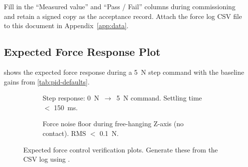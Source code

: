 \begin{notebox}
  Fill in the ``Measured value'' and ``Pass / Fail'' columns during
  commissioning and retain a signed copy as the acceptance record.
  Attach the force log CSV file to this document in Appendix~\ref{app:data}.
\end{notebox}


\subsection{Expected Force Response Plot}
\label{sec:verif:plot}

 shows the expected force response during a
\SI{5}{\newton} step command with the baseline gains from
\cref{tab:pid-defaults}.

\begin{figure}[H]
  \centering
  \begin{subfigure}[b]{0.48\textwidth}
    \fbox{\parbox{\textwidth}{\centering\vspace{28mm}
      \textcolor{PBAGray}{[PLOT: Force step response — time vs F(N)]}\vspace{28mm}}}
    \caption{Step response: \SI{0}{\newton}~$\to$~\SI{5}{\newton} command.
             Settling time $<$ \SI{150}{\milli\second}.}
    \label{fig:step-response}
  \end{subfigure}
  \hfill
  \begin{subfigure}[b]{0.48\textwidth}
    \fbox{\parbox{\textwidth}{\centering\vspace{28mm}
      \textcolor{PBAGray}{[PLOT: Force noise — free-hanging, no contact]}\vspace{28mm}}}
    \caption{Force noise floor during free-hanging Z-axis
             (no contact).  RMS $<$ \SI{0.1}{\newton}.}
    \label{fig:noise-floor}
  \end{subfigure}
  \caption{Expected force control verification plots.
           Generate these from the CSV log using
           .}
  \label{fig:force-response}
\end{figure}



